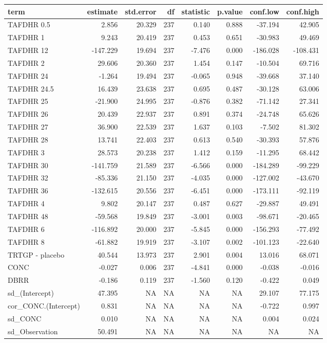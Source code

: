 
\begin{tabular}{lrrrrrrr}
\toprule
term & estimate & std.error & df & statistic & p.value & conf.low & conf.high\\
\midrule
TAFDHR 0.5 & 2.856 & 20.329 & 237 & 0.140 & 0.888 & -37.194 & 42.905\\
TAFDHR 1 & 9.243 & 20.419 & 237 & 0.453 & 0.651 & -30.983 & 49.469\\
TAFDHR 12 & -147.229 & 19.694 & 237 & -7.476 & 0.000 & -186.028 & -108.431\\
TAFDHR 2 & 29.606 & 20.360 & 237 & 1.454 & 0.147 & -10.504 & 69.716\\
TAFDHR 24 & -1.264 & 19.494 & 237 & -0.065 & 0.948 & -39.668 & 37.140\\
TAFDHR 24.5 & 16.439 & 23.638 & 237 & 0.695 & 0.487 & -30.128 & 63.006\\
TAFDHR 25 & -21.900 & 24.995 & 237 & -0.876 & 0.382 & -71.142 & 27.341\\
TAFDHR 26 & 20.439 & 22.937 & 237 & 0.891 & 0.374 & -24.748 & 65.626\\
TAFDHR 27 & 36.900 & 22.539 & 237 & 1.637 & 0.103 & -7.502 & 81.302\\
TAFDHR 28 & 13.741 & 22.403 & 237 & 0.613 & 0.540 & -30.393 & 57.876\\
TAFDHR 3 & 28.573 & 20.238 & 237 & 1.412 & 0.159 & -11.295 & 68.442\\
TAFDHR 30 & -141.759 & 21.589 & 237 & -6.566 & 0.000 & -184.289 & -99.229\\
TAFDHR 32 & -85.336 & 21.150 & 237 & -4.035 & 0.000 & -127.002 & -43.670\\
TAFDHR 36 & -132.615 & 20.556 & 237 & -6.451 & 0.000 & -173.111 & -92.119\\
TAFDHR 4 & 9.802 & 20.147 & 237 & 0.487 & 0.627 & -29.887 & 49.491\\
TAFDHR 48 & -59.568 & 19.849 & 237 & -3.001 & 0.003 & -98.671 & -20.465\\
TAFDHR 6 & -116.892 & 20.000 & 237 & -5.845 & 0.000 & -156.293 & -77.492\\
TAFDHR 8 & -61.882 & 19.919 & 237 & -3.107 & 0.002 & -101.123 & -22.640\\
TRTGP - placebo & 40.544 & 13.973 & 237 & 2.901 & 0.004 & 13.016 & 68.071\\
CONC & -0.027 & 0.006 & 237 & -4.841 & 0.000 & -0.038 & -0.016\\
DBRR & -0.186 & 0.119 & 237 & -1.560 & 0.120 & -0.422 & 0.049\\
sd\_(Intercept) & 47.395 & NA & NA & NA & NA & 29.107 & 77.175\\
cor\_CONC.(Intercept) & 0.831 & NA & NA & NA & NA & -0.722 & 0.997\\
sd\_CONC & 0.010 & NA & NA & NA & NA & 0.004 & 0.024\\
sd\_Observation & 50.491 & NA & NA & NA & NA & NA & NA\\
\bottomrule
\end{tabular}

